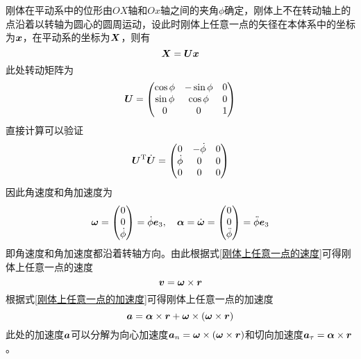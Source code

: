 刚体在平动系中的位形由$OX$轴和$Ox$轴之间的夹角$\phi$确定，刚体上不在转动轴上的点沿着以转轴为圆心的圆周运动，设此时刚体上任意一点的矢径在本体系中的坐标为$\boldsymbol{x}$，在平动系的坐标为$\boldsymbol{X}$，则有
\begin{equation*}
	\boldsymbol{X} = \boldsymbol{U} \boldsymbol{x}
\end{equation*}
此处转动矩阵为
\begin{equation}
	\boldsymbol{U} = \begin{pmatrix} \cos \phi & -\sin \phi & 0 \\ \sin \phi & \cos \phi & 0 \\ 0 & 0 & 1 \end{pmatrix}
	\label{定轴转动的转动矩阵}
\end{equation}
直接计算可以验证
\begin{equation*}
	\boldsymbol{U}^{\mathrm{T}} \dot{\boldsymbol{U}} = \begin{pmatrix} 0 & -\dot{\phi} & 0 \\ \dot{\phi} & 0 & 0 \\ 0 & 0 & 0 \end{pmatrix}
\end{equation*}
因此角速度和角加速度为
\begin{equation*}
	\boldsymbol{\omega} = \begin{pmatrix} 0 \\ 0 \\ \dot{\phi} \end{pmatrix} = \dot{\phi} \boldsymbol{e}_3,\quad \boldsymbol{\alpha} = \dot{\boldsymbol{\omega}} = \begin{pmatrix} 0 \\ 0 \\ \ddot{\phi} \end{pmatrix} = \ddot{\phi} \boldsymbol{e}_3
\end{equation*}
即角速度和角加速度都沿着转轴方向。由此根据式\eqref{刚体上任意一点的速度}可得刚体上任意一点的速度
\begin{equation}
	\boldsymbol{v} = \boldsymbol{\omega} \times \boldsymbol{r}
\end{equation}
根据式\eqref{刚体上任意一点的加速度}可得刚体上任意一点的加速度
\begin{equation}
	\boldsymbol{a} = \boldsymbol{\alpha} \times \boldsymbol{r} + \boldsymbol{\omega} \times (\boldsymbol{\omega} \times \boldsymbol{r})
\end{equation}
此处的加速度$\boldsymbol{a}$可以分解为向心加速度$\boldsymbol{a}_n = \boldsymbol{\omega} \times (\boldsymbol{\omega} \times \boldsymbol{r})$和切向加速度$\boldsymbol{a}_\tau = \boldsymbol{\alpha} \times \boldsymbol{r}$。

